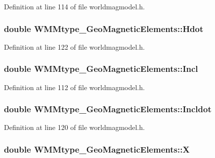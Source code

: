 \-Definition at line 114 of file worldmagmodel.\-h.

\hypertarget{struct_w_m_mtype___geo_magnetic_elements_a4f48837b7b954edff150a6994ff80720}{
\subsubsection[{\-Hdot}]{\setlength{\rightskip}{0pt plus 5cm}double {\bf \-W\-M\-Mtype\-\_\-\-Geo\-Magnetic\-Elements\-::\-Hdot}}}\label{struct_w_m_mtype___geo_magnetic_elements_a4f48837b7b954edff150a6994ff80720}


\-Definition at line 122 of file worldmagmodel.\-h.

\hypertarget{struct_w_m_mtype___geo_magnetic_elements_a4a892ce94600018b364ef34e8416861c}{
\subsubsection[{\-Incl}]{\setlength{\rightskip}{0pt plus 5cm}double {\bf \-W\-M\-Mtype\-\_\-\-Geo\-Magnetic\-Elements\-::\-Incl}}}\label{struct_w_m_mtype___geo_magnetic_elements_a4a892ce94600018b364ef34e8416861c}


\-Definition at line 112 of file worldmagmodel.\-h.

\hypertarget{struct_w_m_mtype___geo_magnetic_elements_ad42b26463a764fbbe5fa6fe815d81f00}{
\subsubsection[{\-Incldot}]{\setlength{\rightskip}{0pt plus 5cm}double {\bf \-W\-M\-Mtype\-\_\-\-Geo\-Magnetic\-Elements\-::\-Incldot}}}\label{struct_w_m_mtype___geo_magnetic_elements_ad42b26463a764fbbe5fa6fe815d81f00}


\-Definition at line 120 of file worldmagmodel.\-h.

\hypertarget{struct_w_m_mtype___geo_magnetic_elements_aa8c06cae11ef4891bf6d43eaeb7787d5}{
\subsubsection[{\-X}]{\setlength{\rightskip}{0pt plus 5cm}double {\bf \-W\-M\-Mtype\-\_\-\-Geo\-Magnetic\-Elements\-::\-X}}}\label{struct_w_m_mtype___geo_magnetic_elements_aa8c06cae11ef4891bf6d43eaeb7787d5}


